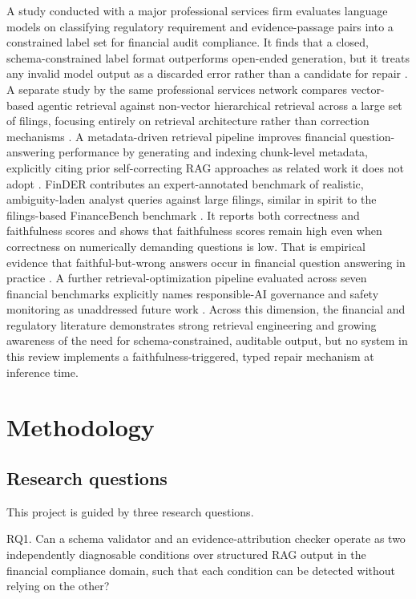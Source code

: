 \documentclass[10pt,twocolumn,letterpaper]{article}
\begin{document}
A study conducted with a major professional services firm evaluates language models on classifying regulatory requirement and evidence-passage pairs into a constrained label set for financial audit compliance. It finds that a closed, schema-constrained label format outperforms open-ended generation, but it treats any invalid model output as a discarded error rather than a candidate for repair \cite{pwcverif}. A separate study by the same professional services network compares vector-based agentic retrieval against non-vector hierarchical retrieval across a large set of filings, focusing entirely on retrieval architecture rather than correction mechanisms \cite{pwcretr}. A metadata-driven retrieval pipeline improves financial question-answering performance by generating and indexing chunk-level metadata, explicitly citing prior self-correcting RAG approaches as related work it does not adopt \cite{metadata}. FinDER contributes an expert-annotated benchmark of realistic, ambiguity-laden analyst queries against large filings, similar in spirit to the filings-based FinanceBench benchmark \cite{financebench}. It reports both correctness and faithfulness scores and shows that faithfulness scores remain high even when correctness on numerically demanding questions is low. That is empirical evidence that faithful-but-wrong answers occur in financial question answering in practice \cite{finder}. A further retrieval-optimization pipeline evaluated across seven financial benchmarks explicitly names responsible-AI governance and safety monitoring as unaddressed future work \cite{gar}. Across this dimension, the financial and regulatory literature demonstrates strong retrieval engineering and growing awareness of the need for schema-constrained, auditable output, but no system in this review implements a faithfulness-triggered, typed repair mechanism at inference time.

\section{Methodology}

\subsection{Research questions}

This project is guided by three research questions.

RQ1. Can a schema validator and an evidence-attribution checker operate as two independently diagnosable conditions over structured RAG output in the financial compliance domain, such that each condition can be detected without relying on the other?
\end{document}

